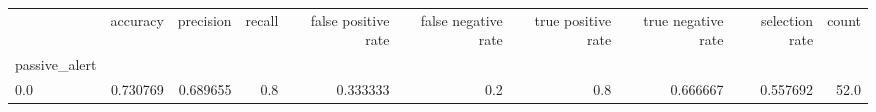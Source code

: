 \begin{tabular}{lrrrrrrrrr}
\toprule
{} &  accuracy &  precision &  recall &  false positive rate &  false negative rate &  true positive rate &  true negative rate &  selection rate &  count \\
passive\_alert &           &            &         &                      &                      &                     &                     &                 &        \\
\midrule
0.0           &  0.730769 &   0.689655 &     0.8 &             0.333333 &                  0.2 &                 0.8 &            0.666667 &        0.557692 &   52.0 \\
\bottomrule
\end{tabular}
